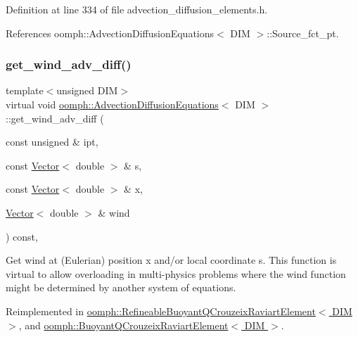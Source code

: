 Definition at line 334 of file advection\+\_\+diffusion\+\_\+elements.\+h.



References oomph\+::\+Advection\+Diffusion\+Equations$<$ D\+I\+M $>$\+::\+Source\+\_\+fct\+\_\+pt.

\mbox{\label{classoomph_1_1AdvectionDiffusionEquations_a32cb2f977b32fabfc23d1134749371ed}} 
\subsubsection{\texorpdfstring{get\+\_\+wind\+\_\+adv\+\_\+diff()}{get\_wind\_adv\_diff()}}
{\footnotesize\ttfamily template$<$unsigned D\+IM$>$ \\
virtual void \hyperlink{classoomph_1_1AdvectionDiffusionEquations}{oomph\+::\+Advection\+Diffusion\+Equations}$<$ D\+IM $>$\+::get\+\_\+wind\+\_\+adv\+\_\+diff (\begin{DoxyParamCaption}\item[{const unsigned \&}]{ipt,  }\item[{const \hyperlink{classoomph_1_1Vector}{Vector}$<$ double $>$ \&}]{s,  }\item[{const \hyperlink{classoomph_1_1Vector}{Vector}$<$ double $>$ \&}]{x,  }\item[{\hyperlink{classoomph_1_1Vector}{Vector}$<$ double $>$ \&}]{wind }\end{DoxyParamCaption}) const\hspace{0.3cm}{\ttfamily [inline]}, {\ttfamily [virtual]}}



Get wind at (Eulerian) position x and/or local coordinate s. This function is virtual to allow overloading in multi-\/physics problems where the wind function might be determined by another system of equations. 



Reimplemented in \hyperlink{classoomph_1_1RefineableBuoyantQCrouzeixRaviartElement_a093f484b86df6e7cb59d4cc9e605fb51}{oomph\+::\+Refineable\+Buoyant\+Q\+Crouzeix\+Raviart\+Element$<$ D\+I\+M $>$}, and \hyperlink{classoomph_1_1BuoyantQCrouzeixRaviartElement_ade5820ae7c44a9371dcc348ca5a3ab1c}{oomph\+::\+Buoyant\+Q\+Crouzeix\+Raviart\+Element$<$ D\+I\+M $>$}.



